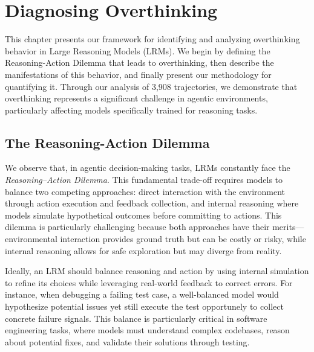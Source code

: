 \chapter{Diagnosing Overthinking}
\label{overthinking}

This chapter presents our framework for identifying and analyzing overthinking behavior in Large Reasoning Models (LRMs). We begin by defining the Reasoning-Action Dilemma that leads to overthinking, then describe the manifestations of this behavior, and finally present our methodology for quantifying it. Through our analysis of 3,908 trajectories, we demonstrate that overthinking represents a significant challenge in agentic environments, particularly affecting models specifically trained for reasoning tasks.

\section{The Reasoning-Action Dilemma}
\label{sec:dilemma_detailed}

We observe that, in agentic decision-making tasks, LRMs constantly face the \emph{Reasoning–Action Dilemma}. This fundamental trade-off requires models to balance two competing approaches: direct interaction with the environment through action execution and feedback collection, and internal reasoning where models simulate hypothetical outcomes before committing to actions. This dilemma is particularly challenging because both approaches have their merits—environmental interaction provides ground truth but can be costly or risky, while internal reasoning allows for safe exploration but may diverge from reality.

Ideally, an LRM should balance reasoning and action by using internal simulation to refine its choices while leveraging real-world feedback to correct errors. For instance, when debugging a failing test case, a well-balanced model would hypothesize potential issues yet still execute the test opportunely to collect concrete failure signals. This balance is particularly critical in software engineering tasks, where models must understand complex codebases, reason about potential fixes, and validate their solutions through testing.

